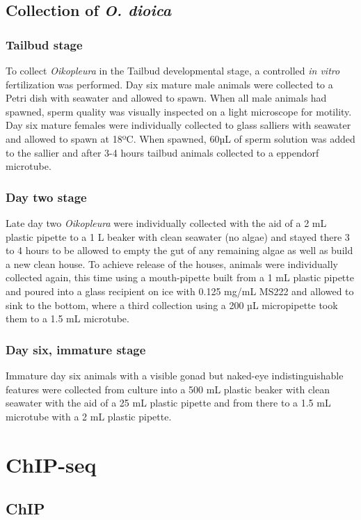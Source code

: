 \documentclass[11pt,twoside,a4paper]{report}
\begin{document}
		\subsection{Collection of \textit{O. dioica}}
			\subsubsection{Tailbud stage}
			To collect \textit{Oikopleura} in the Tailbud developmental stage, a controlled \textit{in vitro} fertilization was performed. Day six mature male animals were collected to a Petri dish with seawater and allowed to spawn. When all male animals had spawned, sperm quality was visually inspected on a light microscope for motility. Day six mature females were individually collected to glass salliers with seawater and allowed to spawn at 18ºC. When spawned, 60µL of sperm solution was added to the sallier and after 3-4 hours tailbud animals collected to a eppendorf microtube.
			
			\subsubsection{Day two stage}
			Late day two \textit{Oikopleura} were individually collected with the aid of a 2 mL plastic pipette to a 1 L beaker with clean seawater (no algae) and stayed there 3 to 4 hours to be allowed to empty the gut of any remaining algae as well as build a new clean house.
			To achieve release of the houses, animals were individually collected again, this time using a mouth-pipette built from a 1 mL plastic pipette and poured into a glass recipient on ice with 0.125 mg/mL MS222 and allowed to sink to the bottom, where a third collection using a 200 µL micropipette took them to a 1.5 mL microtube.
			
			\subsubsection{Day six, immature stage}
			Immature day six animals with a visible gonad but naked-eye indistinguishable features were collected from culture into a 500 mL plastic beaker with clean seawater with the aid of a 25 mL plastic pipette and from there to a 1.5 mL microtube with a 2 mL plastic pipette. 
		
	
	\section{ChIP-seq}
		\subsection{ChIP}
\end{document}
